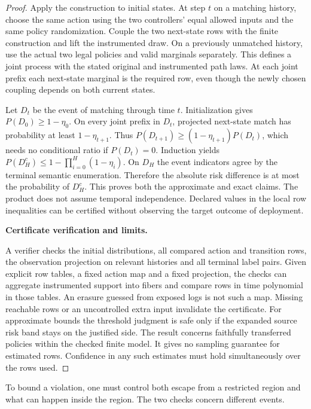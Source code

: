 \begin{proof}
Apply the construction to initial states. At step \(t\) on a matching history, choose the same action using the two controllers' equal allowed inputs and the same policy randomization. Couple the two next-state rows with the finite construction and lift the instrumented draw. On a previously unmatched history, use the actual two legal policies and valid marginals separately. This defines a joint process with the stated original and instrumented path laws. At each joint prefix each next-state marginal is the required row, even though the newly chosen coupling depends on both current states.

Let \(D_t\) be the event of matching through time \(t\). Initialization gives \(P(D_0)\ge1-\eta_0\). On every joint prefix in \(D_t\), projected next-state match has probability at least \(1-\eta_{t+1}\). Thus \(P(D_{t+1})\ge(1-\eta_{t+1})P(D_t)\), which needs no conditional ratio if \(P(D_t)=0\). Induction yields
\(P(D_H^c)\le 1-\prod_{i=0}^H(1-\eta_i).\)
On \(D_H\) the event indicators agree by the terminal semantic enumeration. Therefore the absolute risk difference is at most the probability of \(D_H^c\). This proves both the approximate and exact claims. The product does not assume temporal independence. Declared values in the local row inequalities can be certified without observing the target outcome of deployment.

\textbf{Certificate verification and limits.}

A verifier checks the initial distributions, all compared action and transition rows, the observation projection on relevant histories and all terminal label pairs. Given explicit row tables, a fixed action map and a fixed projection, the checks can aggregate instrumented support into fibers and compare rows in time polynomial in those tables. An erasure guessed from exposed logs is not such a map. Missing reachable rows or an uncontrolled extra input invalidate the certificate. For approximate bounds the threshold judgment is safe only if the expanded source risk band stays on the justified side. The result concerns faithfully transferred policies within the checked finite model. It gives no sampling guarantee for estimated rows. Confidence in any such estimates must hold simultaneously over the rows used.

\end{proof}

To bound a violation, one must control both escape from a restricted region and what can happen inside the region. The two checks concern different events.

